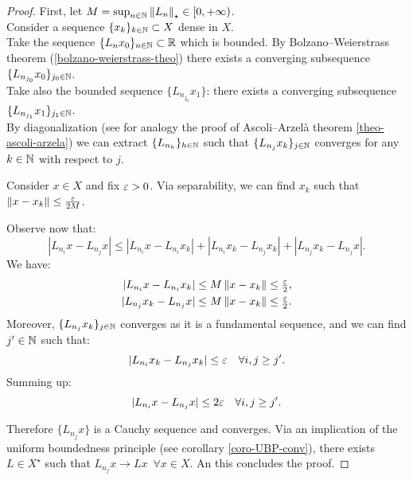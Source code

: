 \begin{proof}
	First, let $M = \sup_{n\in\mathbb N}\left\lVert L_n\right\rVert_\star \in [0, +\infty)$.\\
	Consider a sequence $\{x_k\}_{k\in \mathbb N} \subset X$ dense in $X$.\\
	Take the sequence $\{L_n x_0\}_{n \in \mathbb N} \subset \mathbb R$ which is bounded. By Bolzano--Weierstrass theorem (\vref{bolzano-weierstrass-theo})  there exists a converging subsequence $\{L_{n_{j_0}}x_0\}_{j_0 \in \mathbb N}$.\\
	Take also the bounded sequence $\{L_{n_{j_0}} x_1\}$: there exists a converging subsequence $\{L_{n_{j_1}} x_1\}_{j_1 \in \mathbb N}$.\\
	
	By diagonalization (see for analogy the proof of Ascoli--Arzelà theorem  \vref{theo-ascoli-arzela}) we can extract $\{L_{n_h}\}_{h \in \mathbb N}$ such that $\{L_{n_j} x_k\}_{j\in \mathbb N}$ converges for any $k \in \mathbb N$ with respect to $j$.
	
	Consider $x \in X$ and fix $\varepsilon >0$. Via separability, we can find $x_k$ such that $\left\lVert x-x_k\right\rVert\leq \frac{\varepsilon}{2M}$.

	Observe now that:
	$$ |L_{n_i}x-L_{n_j}x| \leq |L_{n_i} x - L_{n_i}x_k|+|L_{n_i}x_k-L_{n_j}x_k|+|L_{n_j}x_k-L_{n_j}x|. $$
	We have:
	\begin{align*}
		|L_{n_i} x - L_{n_i}x_k| &\leq M \left\lVert x-x_k\right\rVert\leq \tfrac {\varepsilon} 2, \\
		|L_{n_j}x_k-L_{n_j}x| &\leq M \left\lVert x-x_k\right\rVert\leq \tfrac {\varepsilon} 2.
	\end{align*}
	Moreover, $\{L_{n_j} x_k\}_{j\in\mathbb N}$ converges as it is a fundamental sequence, and we can find $j' \in \mathbb N$ such that:
	$$|L_{n_i} x_k - L_{n_j}x_k | \leq \varepsilon \quad \forall i,j \geq j'.$$
	Summing up:
	$$|L_{n_i}x-L_{n_j}x| \leq 2 \varepsilon \quad \forall i, j \ge j'.$$

	Therefore $\{L_{n_j} x\}$ is a Cauchy sequence and converges. Via an implication of the uniform boundedness principle (see corollary \vref{coro-UBP-conv}), there exists $L \in X^\star$ such that $L_{n_j}x \to L x \enspace \forall x \in X$. An this concludes the proof.
\end{proof}

